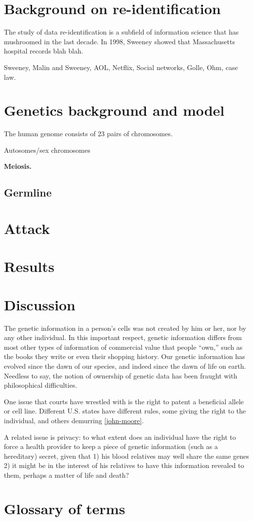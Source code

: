 \documentclass{article}
\begin{document}
\section{Background on re-identification}
The study of data re-identification is a subfield of information science that has mushroomed in the last decade. In 1998, Sweeney \cite{sweeney} showed that Massachusetts hospital records blah blah. 

 Sweeney, Malin and Sweeney, AOL, Netflix, Social networks, Golle, Ohm, case law.

\section{Genetics background and model}
The human genome consists of 23 pairs of chromosomes. 

Autosomes/sex chromosomes

{\bf Meiosis.}

\subsection{Germline}

\section{Attack}

\section{Results}

\section{Discussion}
The genetic information in a person's cells was not created by him or her, nor by any other individual. In this important respect, genetic information differs from most other types of information of commercial value that people ``own,'' such as the books they write or even their shopping history. Our genetic information has evolved since the dawn of our species, and indeed since the dawn of life on earth. Needless to say, the notion of ownership of genetic data has been fraught with philosophical difficulties.

One issue that courts have wrestled with is the right to patent a beneficial allele or cell line. Different U.S. states have different rules, some giving the right to the individual, and others demurring \ref{john-moore}.

A related issue is  privacy: to what extent does an individual have the right to force a health provider to keep a piece of genetic information (such as a hereditary) secret, given that 1) his blood relatives may well share the same genes 2) it might be in the interest of his relatives to have this information revealed to them, perhaps a matter of life and death?


\section{Glossary of terms}

\label{intro}
\end{document}
